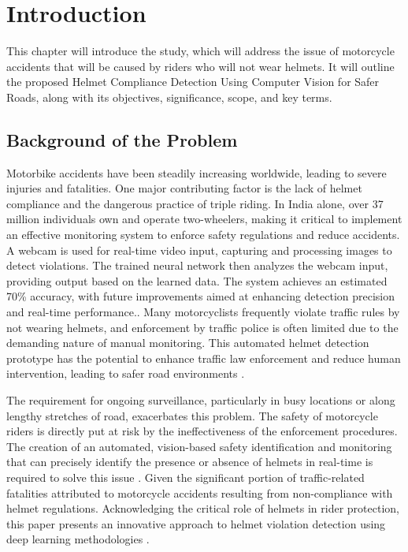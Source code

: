 \chapter{Introduction}
This chapter will introduce the study, which will address the issue of motorcycle accidents that will be caused by riders who will not wear helmets. It will outline the proposed Helmet Compliance Detection Using Computer Vision for Safer Roads, along with its objectives, significance, scope, and key terms.
\begin{refsection}
\section{Background of the Problem}
Motorbike accidents have been steadily increasing worldwide, leading to severe injuries and fatalities. One major contributing factor is the lack of helmet compliance and the dangerous practice of triple riding. In India alone, over 37 million individuals own and operate two-wheelers, making it critical to implement an effective monitoring system to enforce safety regulations and reduce accidents. A webcam is used for real-time video input, capturing and processing images to detect violations. The trained neural network then analyzes the webcam input, providing output based on the learned data. The system achieves an estimated 70\% accuracy, with future improvements aimed at enhancing detection precision and real-time performance.\cite{Maddi2023}. Many motorcyclists frequently violate traffic rules by not wearing helmets, and enforcement by traffic police is often limited due to the demanding nature of manual monitoring. This automated helmet detection prototype has the potential to enhance traffic law enforcement and reduce human intervention, leading to safer road environments \cite{Godbole2024}. 

The requirement for ongoing surveillance, particularly in busy locations or along lengthy stretches of road, exacerbates this problem. The safety of motorcycle riders is directly put at risk by the ineffectiveness of the enforcement procedures. The creation of an automated, vision-based safety identification and monitoring that can precisely identify the presence or absence of helmets in real-time is required to solve this issue \cite {Kumar2023}. Given the significant portion of traffic-related fatalities attributed to motorcycle accidents resulting from non-compliance with helmet regulations. Acknowledging the critical role of helmets in rider protection, this paper presents an innovative approach to helmet violation detection using deep learning methodologies \cite{Said2024}. 


\end{refsection}
